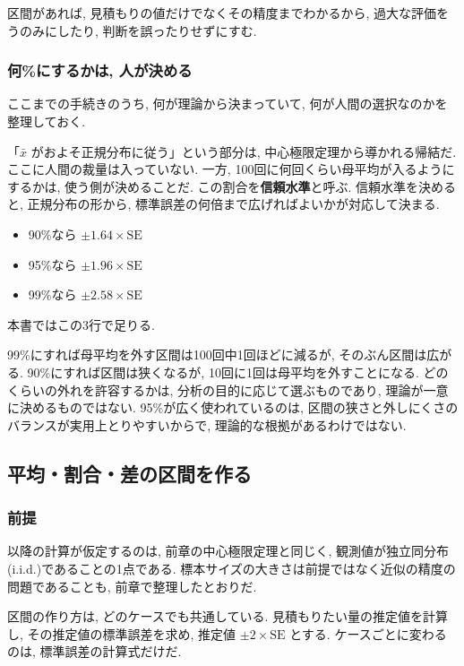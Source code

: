     区間があれば, 見積もりの値だけでなくその精度までわかるから, 過大な評価をうのみにしたり, 判断を誤ったりせずにすむ.

    \subsubsection*{何\%にするかは, 人が決める}

    ここまでの手続きのうち, 何が理論から決まっていて, 何が人間の選択なのかを整理しておく.

    「$\bar{x}$ がおよそ正規分布に従う」という部分は, 中心極限定理から導かれる帰結だ.
    ここに人間の裁量は入っていない.
    一方, 100回に何回くらい母平均が入るようにするかは, 使う側が決めることだ.
    この割合を\textbf{信頼水準}と呼ぶ.
    信頼水準を決めると, 正規分布の形から, 標準誤差の何倍まで広げればよいかが対応して決まる.

    \begin{itemize}
      \item 90\%なら $\pm 1.64 \times \mathrm{SE}$
      \item 95\%なら $\pm 1.96 \times \mathrm{SE}$
      \item 99\%なら $\pm 2.58 \times \mathrm{SE}$
    \end{itemize}

    本書ではこの3行で足りる.

    99\%にすれば母平均を外す区間は100回中1回ほどに減るが, そのぶん区間は広がる.
    90\%にすれば区間は狭くなるが, 10回に1回は母平均を外すことになる.
    どのくらいの外れを許容するかは, 分析の目的に応じて選ぶものであり, 理論が一意に決めるものではない.
    95\%が広く使われているのは, 区間の狭さと外しにくさのバランスが実用上とりやすいからで, 理論的な根拠があるわけではない.

  \subsection{平均・割合・差の区間を作る}

    \subsubsection*{前提}

    以降の計算が仮定するのは, 前章の中心極限定理と同じく, 観測値が独立同分布(i.i.d.)であることの1点である.
    標本サイズの大きさは前提ではなく近似の精度の問題であることも, 前章で整理したとおりだ.

    区間の作り方は, どのケースでも共通している.
    見積もりたい量の推定値を計算し, その推定値の標準誤差を求め, 推定値 $\pm 2 \times \mathrm{SE}$ とする.
    ケースごとに変わるのは, 標準誤差の計算式だけだ.

